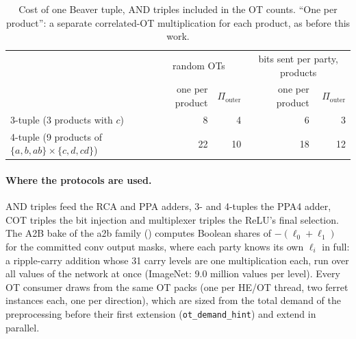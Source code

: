 \begin{table}[t]
\centering\small
\begin{tabular}{@{}lrrrr@{}}
\toprule
& \multicolumn{2}{c}{random OTs} & \multicolumn{2}{c}{bits sent per party, products}\\
& one per product & $\Pi_{\mathrm{outer}}$ & one per product & $\Pi_{\mathrm{outer}}$\\
\midrule
3-tuple (3 products with $c$) & 8 & 4 & 6 & 3\\
4-tuple (9 products of $\{a,b,ab\}\times\{c,d,cd\}$) & 22 & 10 & 18 & 12\\
\bottomrule
\end{tabular}
\caption{Cost of one Beaver tuple, AND triples included in the OT counts. ``One per product'': a separate
correlated-OT multiplication for each product, as before this work.}
\label{tab:otcost}
\end{table}

\paragraph{Where the protocols are used.} AND triples feed the RCA and PPA adders, 3- and 4-tuples the PPA4 adder, COT
triples the bit injection and multiplexer triples the ReLU's final selection. The A2B bake of the a2b family
() computes Boolean shares of $-(\ell_0 + \ell_1)$ for the committed conv output masks, where
each party knows its own $\ell_i$ in full: a ripple-carry addition whose 31 carry levels are one multiplication
each, run over all values of the network at once (ImageNet: 9.0 million values per level). Every OT consumer draws
from the same OT packs (one per HE/OT thread, two ferret instances each, one per direction), which are sized from the
total demand of the preprocessing before their first extension (\texttt{ot\_demand\_hint}) and extend in parallel.
